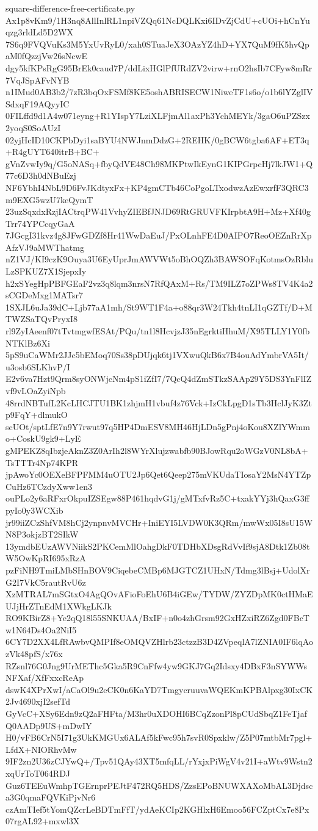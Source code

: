 \documentclass[11pt]{article}
\theoremstyle{definition}
\theoremstyle{remark}
\begin{document}
\begin{filecontents*}[overwrite]{square-difference-free-certificate.py}
Ax1p8vKm9/1H3nq8AllInlRL1npiVZQq61NcDQLKxi6IDvZjCdU+cUOi+hCnYuqzg3rldLd5D2WX
7S6q9FVQVuKs3M5YxUvRyL0/xah0STuaJeX3OAzYZ4hD+YX7QuM9fK5hvQpaM0fQzzjVw26sNcwE
dgy5kfKPsRgG95BrEk0caud7P/ddLixHGlPfURdZV2virw+rnO2hsIb7CFyw8mRr7VqJSpAFvNYB
n1IMud0AB3b2/7zR3bqOxFSMf8KE5oshABRISECW1NiweTF1s6o/o1b6lYZglIVSdxqF19AQyyIC
0FILffd9d1A4w071eyng+R1YIspY7LziXLFjmAl1axPh3YchMEYk/3gaO6uPZSzx2yoqS0SoAUzI
02yjHcID10CKPbDyi1saBYU4NWJnmDdzG+2REHK/0gBCW6tgba6AF+ET3q+R4gUYT640itrB+BC+
gVnZvwIy9q/G5oNASq+fbyQdVE48Ch98MKPtwIkEynG1KIPGrpcHj7lkJW1+Q77c6D3h0dNBuEzj
NF6YbhI4NbL9D6FvJKdtyxFx+KP4gmCTb46CoPgoLTxodwzAzEwxrfF3QRC3m9EXG5wzU7keQymT
23uzSqxdxRzjIACtrqPW41VvhyZIEBfJNJD69RtGRUVFKIrpbtA9H+Mz+Xf40gTrr74YPCcqyGaA
7JGcgI31kvz4g8JFwGDZf8Hr41WwDaEuJ/PxOLnhFE4D0AIPO7ReoOEZnRrXpAfzVJ9aMWThatmg
nZ1VJ/KI9czK9Ouya3U6EyUprJmAWVWt5oBhOQZh3BAWSOFqKotmsOzRbluLzSPKUZ7X1SjepxIy
h2xSYegHpPBFGEaF2vz3q8lqm3nrsN7RfQAxM+Rs/TM9ILZ7oZPWs8TV4K4a2sCGDeMxg1MATsr7
1SXJL6uJa39dC+Ljb77aA1mh/St9WT1F4a+o88qr3W24Tkh4tnLI1qGZTf/D+MTWZSaTQvPryxI8
rl9ZyIAeenf07tTvtmgwfESAt/PQu/tn1l8HcvjzJ35nEgrktiHhuM/X95TLLY1Y0fbNTKlBz6Xi
5pS9uCaWMr2JJc5bEMoq70Ss38pDUjqk6tj1VXwuQkB6x7B4ouAdYmbrVA5It/u3osb6SLKhvP/I
E2v6va7Hzt9Qrm8syONWjcNm4pS1iZfI7/7QcQ4dZmSTkzSAAp29Y5DS3YnFlIZvf9vLOaZyiNpb
48rrdNBTufL2KcLHCJTU1BK1zhjmH1vbuf4z76Vck+IzCkLpgD1sTb3HclJyK3Ztp9FqY+dlmukO
scUOt/sptLfE7n9Y7rwut97q5HP4DmESV8MH46HjLDn5gPnj4oKou8XZlYWmmo+CoskU9gk9+LyE
gMPEKZ8qIbzjeAknZ3Z0ArIh2l8WYrXlujzwabfb90BJowRqu2oWGzV0NL8bA+TsTTTr4Np74KPR
jpAwoYc0OEXeBFPFMM4uOTU2Jp6Qet6Qeep275mVKUdaTIosaY2MsN4YTZpCuHz6TCzdyXww1en3
ouPLo2y6aRFxrOkpuIZSEgw88P461hqdvG1j/gMTxfvRz5C+txakYYj3hQaxG3ffpyIo0y3WCXib
jr99iiZCzShfVM8hCj2ynpnvMVCHr+IniEYI5LVDW0K3QRm/mwWx05I8sU15WN8P3okjzBT2SIkW
13ymdbEUzAWVNiikS2PKCemMlOahgDkF0TDHbXDsgRdVvIf9sjA8Dtk1Zb08tW5OwKpRI695xRzA
pzFiNH9TmiLMbSHnBOV9CiqebeCMBp6MJGTCZ1UHxN/Tdmg3lBsj+UdolXrG2I7VkC5rautRvU6z
XzMTRAL7mSGtxO4AgQOvAFioFoEhU6B4iGEw/TYDW/ZYZDpMK0ctHMaEUJjHrZTnEdM1XWkgLKJk
RO9KBirZ8+Ye2qQ18l55SNKUAA/BxIF+n0o4zhGrsm92GxHZxiRZ6Zgd0FBcTw1N64Ds4Oa2NiI5
6CY7D2XX4LfRAwbvQMPIf8eOMQVZHlrb23ctzzB3D4ZVpeqlA7lZNIA0IF6lqAozVk48pfS/x76x
RZsnl76G0Jng9UrMEThc5Gka5R9CnFfw4yw9GKJ7Gq2Idsxy4DBxF3nSYWWsNFXaf/XfFxxcReAp
dswK4XPrXwI/aCaOl9u2eCK0n6KaYD7TmgycruuvaWQEKmKPBAlpxg30IxCK2Jv4690xjI2sefTd
GyVcC+XSy6Edn9zQ2aFHFta/M3hr0uXDOHI6BCqZzonPl8pCUdSbqZ1FeTjafQ0AADp9US+mDwIY
H0/vFB6CrN5I71g3UkKMGUx6ALAf5kFwc95h7svR0Spxklw/Z5P07mtbMr7pgl+LfdX+NIORhvMw
9IF2zn2U36zCJYwQ+/Tpv51QAy43XT5mfqLL/rYxjxPiWgV4v21I+aWtv9Wstn2xqUrToT064RDJ
Guz6TEEuWmhpTGErnprPEJtF472RQ5HDS/ZzsEPoBNUWXAXoMbAL3Djdsca3G0qmaFQVKiPjvNr6
czAmTIef5tYomQZcrLeBDTmFfT/ydAeKCIp2KGHlxH6Emoo56FCZptCx7e8Px07rgAL92+mxwl3X

\end{filecontents*}
\end{document}
